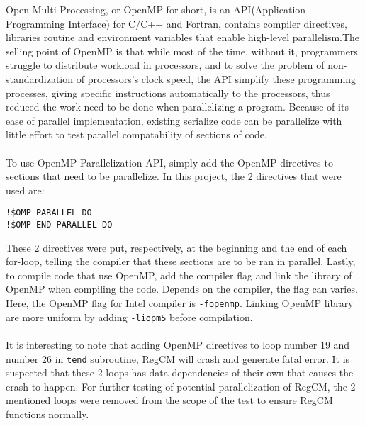 Open Multi-Processing, or OpenMP for short, is an API(Application Programming Interface) for C/C++ and Fortran, contains compiler directives, libraries routine and environment variables that enable high-level parallelism.The selling point of OpenMP is that while most of the time, without it, programmers struggle to distribute workload in processors, and to solve the problem of non-standardization of processors's clock speed, the API simplify these programming processes, giving specific instructions automatically to the processors, thus reduced the work need to be done when parallelizing a program. Because of its ease of parallel implementation, existing serialize code can be parallelize with little effort to test parallel compatability of sections of code. \\
~\\
To use OpenMP Parallelization API, simply add the OpenMP directives to sections that need to be parallelize. In this project, the 2 directives that were used are: 
\begin{center}
\begin{BVerbatim}
!$OMP PARALLEL DO
!$OMP END PARALLEL DO
\end{BVerbatim}
\end{center}
These 2 directives were put, respectively, at the beginning and the end of each for-loop, telling the compiler that these sections are to be ran in parallel. Lastly, to compile code that use OpenMP, add the compiler flag and link the library of OpenMP when compiling the code. Depends on the compiler, the flag can varies. Here, the OpenMP flag for Intel compiler is \verb|-fopenmp|. Linking OpenMP library are more uniform by adding \verb|-liopm5| before compilation. \\
~\\
It is interesting to note that adding OpenMP directives to loop number 19 and number 26 in \verb|tend| subroutine, RegCM will crash and generate fatal error. It is suspected that these 2 loops has data dependencies of their own that causes the crash to happen. For further testing of potential parallelization of RegCM, the 2 mentioned loops were removed from the scope of the test to ensure RegCM functions normally. \\